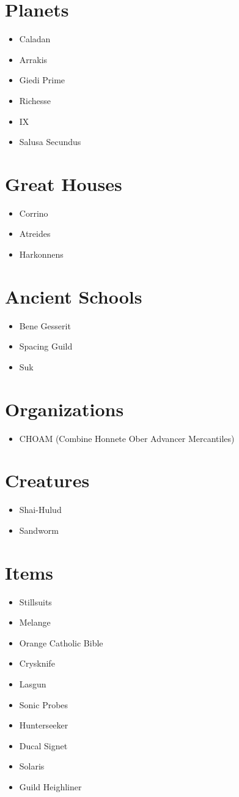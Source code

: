 \documentclass{article}
\begin{document}
\section{Planets}
\begin{itemize}
\item Caladan 
\item Arrakis
\item Giedi Prime
\item Richesse
\item IX
\item Salusa Secundus
\end{itemize}

\section{Great Houses}
\begin{itemize}
\item Corrino
\item Atreides 
\item Harkonnens
\end{itemize}

\section{Ancient Schools}
\begin{itemize}
\item Bene Gesserit 
\item Spacing Guild
\item Suk
\end{itemize}

\section{Organizations}
\begin{itemize}
\item CHOAM (Combine Honnete Ober Advancer Mercantiles)
\end{itemize}

\section{Creatures}
\begin{itemize}
\item Shai-Hulud
\item Sandworm 
\end{itemize}

\section{Items}
\begin{itemize}
\item Stillsuits
\item Melange
\item Orange Catholic Bible
\item Crysknife
\item Lasgun 
\item Sonic Probes 
\item Hunterseeker 
\item Ducal Signet 
\item Solaris 
\item Guild Heighliner 
\end{itemize}
\end{document}
